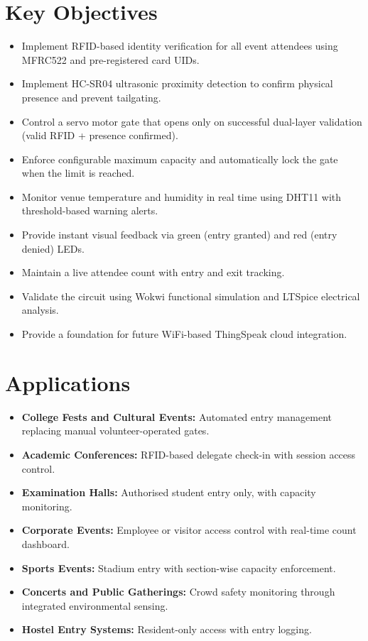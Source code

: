 \documentclass[12pt,a4paper]{report}
\begin{document}
\section{Key Objectives}

\begin{itemize}[leftmargin=*]
    \item Implement RFID-based identity verification for all event attendees using MFRC522 and pre-registered card UIDs.
    \item Implement HC-SR04 ultrasonic proximity detection to confirm physical presence and prevent tailgating.
    \item Control a servo motor gate that opens only on successful dual-layer validation (valid RFID + presence confirmed).
    \item Enforce configurable maximum capacity and automatically lock the gate when the limit is reached.
    \item Monitor venue temperature and humidity in real time using DHT11 with threshold-based warning alerts.
    \item Provide instant visual feedback via green (entry granted) and red (entry denied) LEDs.
    \item Maintain a live attendee count with entry and exit tracking.
    \item Validate the circuit using Wokwi functional simulation and LTSpice electrical analysis.
    \item Provide a foundation for future WiFi-based ThingSpeak cloud integration.
\end{itemize}

\section{Applications}

\begin{itemize}[leftmargin=*]
    \item \textbf{College Fests and Cultural Events:} Automated entry management replacing manual volunteer-operated gates.
    \item \textbf{Academic Conferences:} RFID-based delegate check-in with session access control.
    \item \textbf{Examination Halls:} Authorised student entry only, with capacity monitoring.
    \item \textbf{Corporate Events:} Employee or visitor access control with real-time count dashboard.
    \item \textbf{Sports Events:} Stadium entry with section-wise capacity enforcement.
    \item \textbf{Concerts and Public Gatherings:} Crowd safety monitoring through integrated environmental sensing.
    \item \textbf{Hostel Entry Systems:} Resident-only access with entry logging.
\end{itemize}
\end{document}
